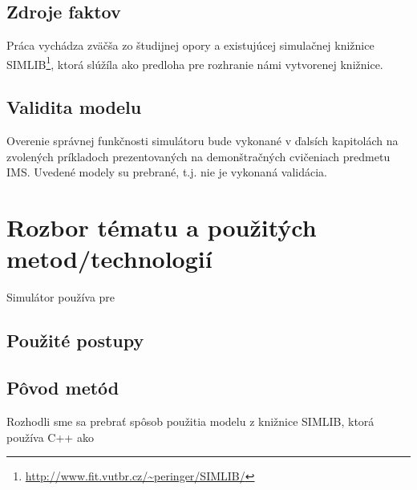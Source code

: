 \documentclass[11pt, a4paper, titlepage]{article}
\begin{document}
\subsection{Zdroje faktov}
Práca vychádza zväčša zo študijnej opory\cite{opora} a existujúcej simulačnej knižnice SIMLIB\footnote{\url{http://www.fit.vutbr.cz/~peringer/SIMLIB/}}, ktorá slúžíla ako predloha pre rozhranie námi vytvorenej knižnice.

\subsection{Validita modelu}
Overenie správnej funkčnosti simulátoru bude vykonané v ďalsích kapitolách na zvolených príkladoch prezentovaných na demonštračných cvičeniach
predmetu IMS. Uvedené modely su prebrané, t.j. nie je vykonaná validácia.

\section{Rozbor tématu a použitých metod/technologií}
Simulátor používa pre
\cite[str.~36]{opora}

\subsection{Použité postupy}

\subsection{Pôvod metód}
Rozhodli sme sa prebrať spôsob použitia modelu z knižnice SIMLIB, ktorá používa C++ ako 

%
%
\end{document}
